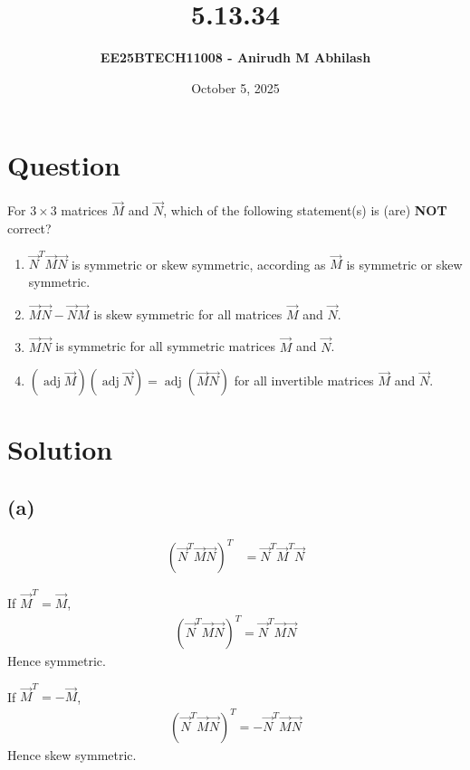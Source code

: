 \documentclass[12pt]{article}
\title{\textbf{5.13.34}}
\author{\textbf{EE25BTECH11008 - Anirudh M Abhilash}}
\date{October 5, 2025}
\begin{document}
\maketitle

\section*{Question}

For $3 \times 3$ matrices $\vec{M}$ and $\vec{N}$, which of the following statement(s) is (are) \textbf{NOT} correct?  

\begin{multicols}{2}
\begin{enumerate}[label=(\alph*)]
\item $\vec{N}^T \vec{M} \vec{N}$ is symmetric or skew symmetric, according as $\vec{M}$ is symmetric or skew symmetric.
\item $\vec{M}\vec{N} - \vec{N}\vec{M}$ is skew symmetric for all matrices $\vec{M}$ and $\vec{N}$.
\item $\vec{M}\vec{N}$ is symmetric for all symmetric matrices $\vec{M}$ and $\vec{N}$.
\item $(\operatorname{adj}\vec{M})(\operatorname{adj}\vec{N}) = \operatorname{adj}(\vec{M}\vec{N})$ for all invertible matrices $\vec{M}$ and $\vec{N}$.
\end{enumerate}
\end{multicols}


\section*{Solution}

\subsection*{(a)}

\begin{align}
(\vec{N}^T \vec{M} \vec{N})^T &= \vec{N}^T \vec{M}^T \vec{N}
\end{align}

If $\vec{M}^T = \vec{M}$,  
\begin{align}
(\vec{N}^T \vec{M} \vec{N})^T = \vec{N}^T \vec{M} \vec{N}
\end{align}
Hence symmetric.

If $\vec{M}^T = -\vec{M}$,  
\begin{align}
(\vec{N}^T \vec{M} \vec{N})^T = -\vec{N}^T \vec{M} \vec{N}
\end{align}
Hence skew symmetric.  
\end{document}
